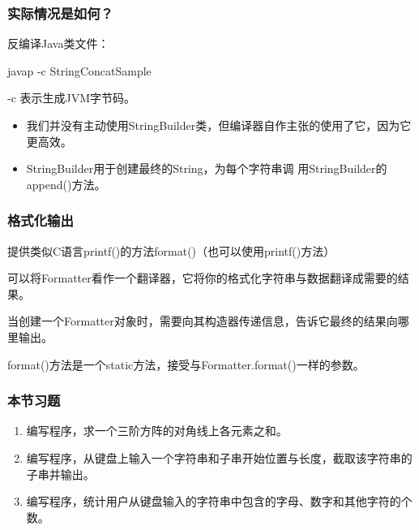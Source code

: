 \begin{frame}[fragile]
  \frametitle{实际情况是如何？}


  反编译Java类文件：
  
  \begin{shCode}
    javap -c StringConcatSample
  \end{shCode}

  {\kai -c 表示生成JVM字节码。}

  \pause

  \begin{itemize}
  \item 我们并没有主动使用StringBuilder类，但编译器自作主张的使用了它，因为它{\hei\Red 更高效}。
  \item StringBuilder用于创建最终的String，为每个字符串调
    用StringBuilder的append()方法。
\end{itemize}
  
\end{frame}

\begin{frame}[fragile]
  \frametitle{格式化输出}


  提供类似C语言printf()的方法format()（也可以使用printf()方法）


  可以将Formatter看作一个翻译器，它将你的格式化字符串与数据翻译成需要的结果。

  当创建一个Formatter对象时，需要向其构造器传递信息，告诉它最终的结果向哪里输出。


  format()方法是一个static方法，接受与Formatter.format()一样的参数。

  
\end{frame}


\begin{frame}
  \frametitle{本节习题}

  \begin{enumerate}
  \item 编写程序，求一个三阶方阵的对角线上各元素之和。
  \item 编写程序，从键盘上输入一个字符串和子串开始位置与长度，截取该字符串的子串并输出。
  \item 编写程序，统计用户从键盘输入的字符串中包含的字母、数字和其他字符的个数。
  \end{enumerate}
\end{frame}



